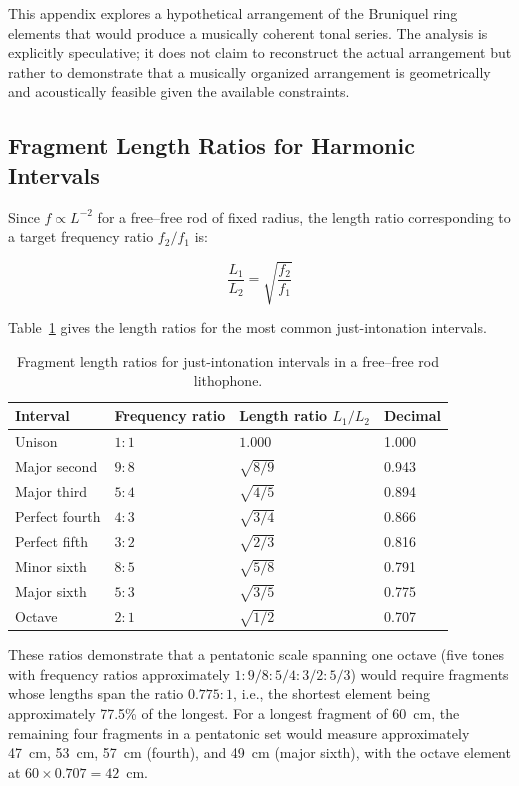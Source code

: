 \documentclass[12pt]{article}
\begin{document}
This appendix explores a hypothetical arrangement of the Bruniquel ring elements that would produce a musically coherent tonal series. The analysis is explicitly speculative; it does not claim to reconstruct the actual arrangement but rather to demonstrate that a musically organized arrangement is geometrically and acoustically feasible given the available constraints.

\subsection*{Fragment Length Ratios for Harmonic Intervals}

Since $f \propto L^{-2}$ for a free--free rod of fixed radius, the length ratio corresponding to a target frequency ratio $f_2/f_1$ is:

\begin{equation}
\frac{L_1}{L_2} = \sqrt{\frac{f_2}{f_1}}
\end{equation}

Table~\ref{tab:ratios} gives the length ratios for the most common just-intonation intervals.

\begin{table}[h]
\centering
\caption{Fragment length ratios for just-intonation intervals in a free--free rod lithophone.}
\label{tab:ratios}
\begin{tabular}{@{}llll@{}}
\toprule
Interval & Frequency ratio & Length ratio $L_1/L_2$ & Decimal \\
\midrule
Unison & $1:1$ & $1.000$ & 1.000 \\
Major second & $9:8$ & $\sqrt{8/9}$ & 0.943 \\
Major third & $5:4$ & $\sqrt{4/5}$ & 0.894 \\
Perfect fourth & $4:3$ & $\sqrt{3/4}$ & 0.866 \\
Perfect fifth & $3:2$ & $\sqrt{2/3}$ & 0.816 \\
Minor sixth & $8:5$ & $\sqrt{5/8}$ & 0.791 \\
Major sixth & $5:3$ & $\sqrt{3/5}$ & 0.775 \\
Octave & $2:1$ & $\sqrt{1/2}$ & 0.707 \\
\bottomrule
\end{tabular}
\end{table}

These ratios demonstrate that a pentatonic scale spanning one octave (five tones with frequency ratios approximately $1 : 9/8 : 5/4 : 3/2 : 5/3$) would require fragments whose lengths span the ratio $0.775 : 1$, i.e., the shortest element being approximately 77.5\% of the longest. For a longest fragment of 60~cm, the remaining four fragments in a pentatonic set would measure approximately 47~cm, 53~cm, 57~cm (fourth), and 49~cm (major sixth), with the octave element at $60 \times 0.707 = 42$~cm.
\end{document}
